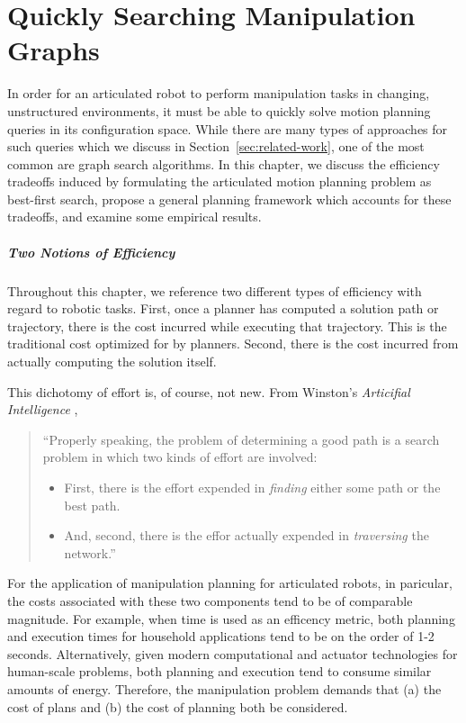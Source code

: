 \documentclass{report}
\begin{document}
\newpage
\chapter{Quickly Searching Manipulation Graphs}
\label{chap:inflate}

In order for an articulated robot to perform manipulation tasks
in changing, unstructured environments,
it must be able to quickly solve motion planning queries in its
configuration space.
While there are many types of approaches for such queries
which we discuss in Section~\ref{sec:related-work},
one of the most common are graph search algorithms.
In this chapter,
we discuss the efficiency tradeoffs induced by formulating
the articulated motion planning problem as best-first search,
propose a general planning framework which accounts for these tradeoffs,
and examine some empirical results.

\paragraph{Two Notions of Efficiency}

Throughout this chapter,
we reference two different types of efficiency
with regard to robotic tasks.
First, once a planner has computed a solution path or trajectory,
there is the cost incurred while executing that trajectory.
This is the traditional cost optimized for by planners.
Second, there is the cost incurred from actually computing the solution
itself.

This dichotomy of effort is, of course, not new.
From Winston's \emph{Articifial Intelligence} \cite{winston1977ai},
\begin{quote}
   ``Properly speaking, the problem of determining a good path is a search
   problem in which two kinds of effort are involved:
   \begin{itemize}
   \item First, there is the effort expended in \emph{finding} either
      some path or the best path.
   \item And, second, there is the effor actually expended in
      \emph{traversing} the network.''
   \end{itemize}
\end{quote}

For the application of manipulation planning for articulated robots,
in paricular,
the costs associated with these two components tend to be of comparable
magnitude.
For example,
when time is used as an efficency metric,
both planning and execution times for household applications
tend to be on the order of 1-2 seconds.
Alternatively, given
modern computational and actuator technologies for human-scale problems,
both planning and execution tend to consume similar amounts of energy.
Therefore,
the manipulation problem demands that
(a) the cost of plans and
(b) the cost of planning both be considered.
\end{document}
